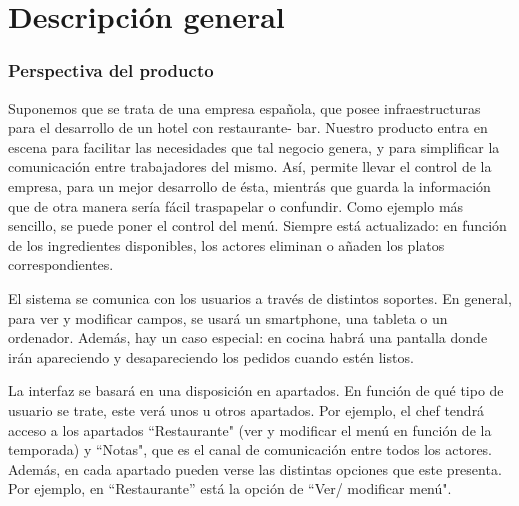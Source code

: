 \documentclass[spanish,a4paper,11pt, twoside]{report}	%
\begin{document}
\part{Descripción general}
\section{Perspectiva del producto}

Suponemos que se trata de una empresa española, que posee infraestructuras para el desarrollo de un hotel con restaurante- bar. Nuestro producto entra en escena para facilitar las necesidades que tal negocio genera, y para simplificar la comunicación entre trabajadores del mismo. Así, permite llevar el control de la empresa, para un mejor desarrollo de ésta, mientrás que guarda la información que de otra manera sería fácil traspapelar o confundir. Como ejemplo más sencillo, se puede poner el control del menú. Siempre está actualizado: en función de los ingredientes disponibles, los actores eliminan o añaden los platos correspondientes. 

El sistema se comunica con los usuarios a través de distintos soportes. En general, para ver y modificar campos, se usará un smartphone, una tableta o un ordenador. Además, hay un caso especial: en cocina habrá una pantalla donde irán apareciendo y desapareciendo los pedidos cuando estén listos.

La interfaz se basará en una disposición en apartados. En función de qué tipo de usuario se trate, este verá unos u otros apartados. Por ejemplo, el chef tendrá acceso a los apartados “Restaurante" (ver y modificar el menú en función de la temporada) y  “Notas", que es el canal de comunicación entre todos los actores. Además, en cada apartado pueden verse las distintas opciones que este presenta. Por ejemplo, en “Restaurante'' está la opción de “Ver/ modificar menú".
\end{document}
